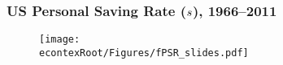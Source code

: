 \documentclass[pdflatex]{beamer}
\begin{document}


\begin{frame}
   \titlepage
\end{frame}
 


\begin{frame}
  \frametitle{\textbf{US Personal Saving Rate ($s$), 1966--2011}}

  \begin{figure}
    \texttt{[image: \\econtexRoot/Figures/fPSR\_slides.pdf]}
  \end{figure}
\end{frame}
\end{document}
